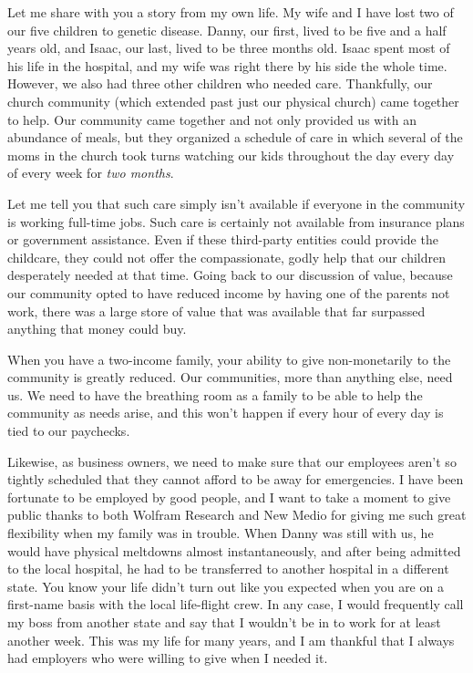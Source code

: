 Let me share with you a story from my own life. My wife and I have lost
two of our five children to genetic disease. Danny, our first, lived to
be five and a half years old, and Isaac, our last, lived to be three
months old. Isaac spent most of his life in the hospital, and my wife
was right there by his side the whole time. However, we also had three
other children who needed care. Thankfully, our church community (which
extended past just our physical church) came together to help. Our
community came together and not only provided us with an abundance of
meals, but they organized a schedule of care in which several of the
moms in the church took turns watching our kids throughout the day
every day of every week for \textit{two months}. 

Let me tell you that such care simply isn’t available if everyone in the
community is working full-time jobs. Such care is certainly not
available from insurance plans or government assistance. Even if these
third-party entities could provide the childcare, they could not offer
the compassionate,
godly help that our children desperately needed at that time. Going
back to our discussion of value, because our community opted to have
reduced income by having one of the parents not work, there was a large
store of value that was available that far surpassed anything that
money could buy.

When you have a two-income family, your ability to give non-monetarily
to the community is greatly reduced. Our communities, more than
anything else, need us. We need to have the breathing room as a family
to be able to help the community as needs arise, and this won’t happen
if every hour of every day is tied to our paychecks.

Likewise, as business owners, we need to make sure that our employees
aren’t so tightly scheduled that they cannot afford to be away for
emergencies. I have been fortunate to be employed by good people, and I
want to take a moment to give public thanks to both Wolfram Research
and New Medio for giving me such great flexibility when my family was
in trouble. When Danny was still with us, he would have physical
meltdowns almost instantaneously, and after being admitted to the local
hospital, he had to be transferred to another hospital in a different
state. You know your life didn’t turn out like you expected when you
are on a first-name basis with the local life-flight crew. In any case,
I would frequently call my boss from another state and say that I
wouldn’t be in to work for at least another week. This was my life for
many years, and I am thankful that I always had employers who were
willing to give when I needed it.

